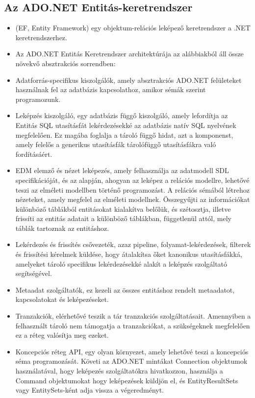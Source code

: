 \documentclass[colorlinks]{thesis-kando}
\theoremstyle{definition}
\theoremstyle{remark}
\begin{document}
\subsection{Az ADO.NET Entitás-keretrendszer }
\begin{itemize}
   \item (EF, Entity Framework) egy objektum-relációs leképező keretrendszer a .NET keretrendszerhez.

   \item Az ADO.NET Entitás Keretrendszer architektúrája az alábbiakból áll össze növekvő absztrakciós sorrendben:

   \item  Adatforrás-specifikus kiszolgálók, amely absztrakciós ADO.NET felületeket használnak fel az adatbázis kapcsolathoz, amikor sémák szerint programozunk.

   \item Leképzés kiszolgáló, egy adatbázis függő kiszolgáló, amely lefordítja az Entitás SQL utasításfát lekérdezésekké az adatbázis natív SQL nyelvének megfelelően. Ez magába foglalja a tároló függő hidat, azt a komponenst, amely felelős a generikus utasításfák tárolófüggő utasításfákra való fordításáért.

   \item  EDM elemző és nézet leképezés, amely felhasználja az adatmodell SDL specifikációját, és az alapján, ahogyan az leképez a relációs modellre, lehetővé teszi az elméleti modellben történő programozást. A relációs sémából létrehoz nézeteket, amely megfelel az elméleti modellnek. Összegyűjti az információkat különböző táblákból entitásokat kialakítva belőlük, és szétosztja, illetve frissíti az entitás adatait a különböző táblákban, függetlenül attól, mely táblák tartoznak az entitáshoz.

   \item Lekérdezés és frissítés csővezeték, azaz pipeline, folyamat-lekérdezések, filterek és frissítési kérelmek küldése, hogy átalakítsa őket kanonikus utasításfákká, amelyeket tároló specifikus lekérdezésekké alakít a leképzés szolgáltató segítségével.
   \item   Metaadat szolgáltatók, ez kezeli az összes entitáshoz rendelt metaadatot, kapcsolatokat és leképezéseket.
   \item  Tranzakciók, elérhetővé teszik a tár tranzakciós szolgáltatásait. Amennyiben a felhasznált tároló nem támogatja a tranzakciókat, a szükségeknek megfelelően ez a réteg valósítja meg ezeket.

   \item   Koncepciós réteg API, egy olyan környezet, amely lehetővé teszi a koncepciós séma programozását. Követi az ADO.NET mintákat Connection objektumok használatával, hogy leképezés szolgáltatókra hivatkozzon, használja a Command objektumokat hogy leképezések küldjön el, és EntityResultSets vagy EntitySets-ként adja vissza a végeredményt.


\end{itemize}
\end{document}
